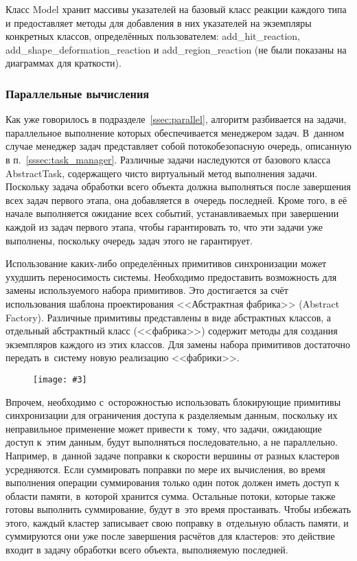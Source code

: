 \documentclass[a4paper, 14pt, titlepage]{extarticle}
\newcommand{\eng}[1]{{\English #1}}
\newenvironment{myfigure}[2]%
    {\pushQED{\caption{#1} \label{#2}} %
     \begin{figure}[!htb]\centering } %
    {  \popQED %
     \end{figure}}
\newcommand{\includefigure}[3][]{
    \begin{myfigure}{#2}{fig:#3}
      \texttt{[image: \#3]}
    \end{myfigure}
  }
\begin{document}
        Класс Model хранит массивы указателей на базовый класс реакции каждого типа и предоставляет
        методы для добавления в них указателей на экземпляры конкретных классов, определённых
        пользователем: add\_hit\_reaction, add\_shape\_deformation\_reaction и add\_region\_reaction
        (не были показаны на диаграммах для краткости).

      \subsubsection{Параллельные вычисления}

        Как уже говорилось в подразделе~\ref{ssec:parallel}, алгоритм разбивается на задачи, параллельное
        выполнение которых обеспечивается менеджером задач. В~данном случае менеджер задач представляет собой
        потокобезопасную очередь, описанную в п.~\ref{sssec:task_manager}. Различные задачи
        наследуются от базового класса AbstractTask, содержащего чисто виртуальный метод выполнения
        задачи.  Поскольку задача обработки всего объекта должна выполняться после завершения всех
        задач первого этапа, она добавляется в~очередь последней. Кроме того, в её начале
        выполняется ожидание всех событий, устанавливаемых при завершении каждой из задач первого
        этапа, чтобы гарантировать то, что эти задачи уже выполнены, поскольку очередь задач этого не гарантирует.

        Использование каких-либо определённых примитивов синхронизации может ухудшить переносимость
        системы. Необходимо предоставить возможность для замены используемого набора примитивов.
        Это достигается за счёт использования шаблона проектирования <<Абстрактная фабрика>> (\eng{Abstract
        Factory}). Различные примитивы представлены в виде абстрактных классов, а отдельный
        абстрактный класс (<<фабрика>>) содержит методы для создания экземпляров каждого из этих
        классов. Для замены набора примитивов достаточно передать в~систему новую реализацию
        <<фабрики>>.

        \includefigure{абстрактная фабрика примитивов синхронизации.}{parallel}

        Впрочем, необходимо с~осторожностью использовать блокирующие примитивы синхронизации для
        ограничения доступа к разделяемым данным, поскольку их неправильное применение может
        привести к~тому, что задачи, ожидающие доступ к~этим данным, будут выполняться
        последовательно, а не параллельно.  Например, в~данной задаче поправки к скорости вершины от
        разных кластеров усредняются. Если суммировать поправки по мере их вычисления, во время
        выполнения операции суммирования только один поток должен иметь доступ к области памяти,
        в~которой хранится сумма. Остальные потоки, которые также готовы выполнить суммирование,
        будут в~это время простаивать. Чтобы избежать этого, каждый кластер записывает свою поправку
        в~отдельную область памяти, и суммируются они уже после завершения расчётов для кластеров:
        это действие входит в задачу обработки всего объекта, выполняемую последней.
\end{document}
